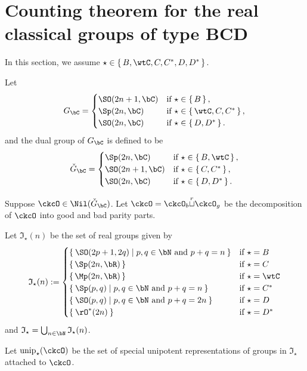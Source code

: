 \documentclass[12pt,a4paper]{amsart}
\numberwithin{equation}{section}
\theoremstyle{remark}
\def\unip{\mathrm{unip}}
\def\IC{\mathfrak{I}}
\def\ckG{\check{G}}
\def\ckGc{\check{G}_{\bC}}
\def\Gc{G_\bC}
\def\cuprow{{\stackrel{r}{\sqcup}}}
\begin{document}
\section{Counting theorem for the real classical groups of type BCD}







In this section, we assume $\star \in \set{B,\wtC,C,C^{*}, D, D^{*}}$.

Let
\[
  \Gc =
  \begin{cases}
    \SO(2n+1,\bC) & \text{if } \star \in \set{B},\\
    \Sp(2n,\bC) & \text{if } \star \in \set{\wtC, C, C^{*}},\\
    \SO(2n,\bC) & \text{if } \star \in \set{D,D^{*}}.\\
  \end{cases}
\]
and the dual group of $\Gc$ is defined to be
\[
  \ckGc =
  \begin{cases}
    \Sp(2n,\bC) & \text{if } \star \in \set{B,\wtC},\\
    \SO(2n+1,\bC) & \text{if } \star \in \set{C, C^{*}},\\
    \SO(2n,\bC) & \text{if } \star \in \set{D,D^{*}}.\\
  \end{cases}
\]

Suppose $\ckcO\in \Nil(\ckG_{\bC})$.
Let $\ckcO = \ckcO_{b}\cuprow \ckcO_{g}$ be
the decomposition of $\ckcO$ into good and bad parity parts.

Let $\IC_{\star}(n)$ be the set of real groups given by
\[
  \IC_{\star}(n)
  :=
  \begin{cases}
    \Set{\SO(2p+1,2q)| p,q\in \bN \text{ and } p+q = n}
    & \text{if } \star = B\\
    \set{\Sp(2n,\bR)}
    & \text{if } \star = C\\
    \set{\Mp(2n,\bR)}
    & \text{if } \star = \wtC\\
    \Set{\Sp(p,q)| p,q\in \bN \text{ and } p+q = n}
    & \text{if } \star = C^{*}\\
    \Set{\SO(p,q)| p,q\in \bN \text{ and } p+q = 2n}
    & \text{if } \star = D\\
    \Set{\rO^{*}(2n)}
    & \text{if } \star = D^{*}\\
  \end{cases}
\]
and $\IC_{\star} = \bigcup_{n\in \bN} \IC_{\star}(n)$.

Let $ \unip_{\star}(\ckcO)$ be the set of special unipotent representations
of groups in $\IC_{\star}$ attached to $\ckcO$.
\end{document}
